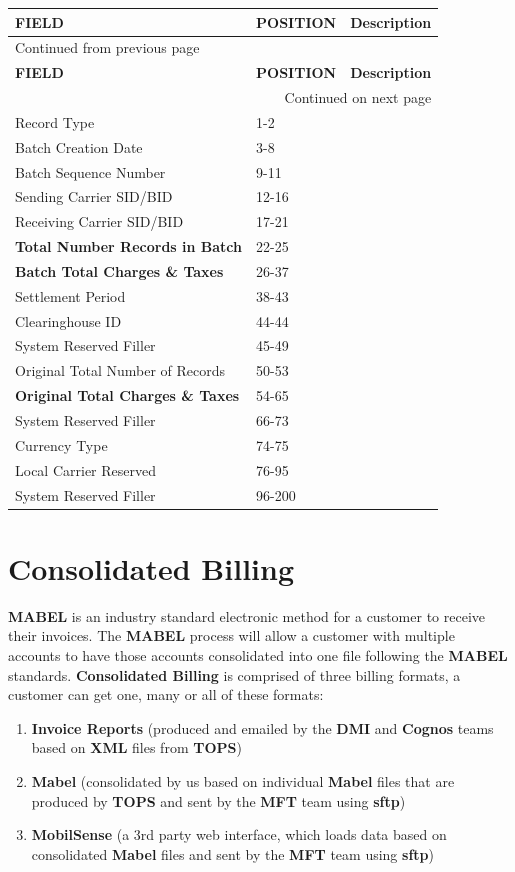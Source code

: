 \documentclass[12pt,twoside]{article}
\begin{document}
\begin{longtable}{l|l|l}
\hline
\textbf{FIELD} & \textbf{POSITION} & \textbf{Description}\\
\hline
\endfirsthead
\multicolumn{3}{l}{Continued from previous page} \\
\hline

\textbf{FIELD} & \textbf{POSITION} & \textbf{Description} \\

\hline
\endhead
\hline\multicolumn{3}{r}{Continued on next page} \\
\endfoot
\endlastfoot
\hline
Record Type & 1-2 & \\
Batch Creation Date & 3-8 & \\
Batch Sequence Number & 9-11 & \\
Sending Carrier SID/BID & 12-16 & \\
Receiving Carrier SID/BID & 17-21 & \\
\textbf{Total Number Records in Batch} & 22-25 & \\
\textbf{Batch Total Charges \& Taxes} & 26-37 & \\
Settlement Period & 38-43 & \\
Clearinghouse ID & 44-44 & \\
System Reserved Filler & 45-49 & \\
Original Total Number of Records & 50-53 & \\
\textbf{Original Total Charges \& Taxes} & 54-65 & \\
System Reserved Filler & 66-73 & \\
Currency Type & 74-75 & \\
Local Carrier Reserved & 76-95 & \\
System Reserved Filler & 96-200 & \\
\hline
\end{longtable}
\normalsize
\newpage
\section{Consolidated Billing}
\label{sec:orgheadline60}
\textbf{MABEL} is an industry standard electronic method for a customer to receive their invoices.  
The \textbf{MABEL} process will allow a customer with multiple accounts to have those accounts consolidated into one file following the \textbf{MABEL} standards. 
\textbf{Consolidated Billing} is comprised of three billing formats, a customer can get one, many or all of these formats:
\begin{enumerate}
\item \textbf{Invoice Reports} (produced and emailed by the \textbf{DMI} and \textbf{Cognos} teams based on \textbf{XML} files from \textbf{TOPS})
\item \textbf{Mabel}  (consolidated by us based on individual \textbf{Mabel} files that are produced by \textbf{TOPS} and sent by the \textbf{MFT} team using \textbf{sftp})
\item \textbf{MobilSense} (a 3rd party web interface, which loads data based on consolidated \textbf{Mabel} files and sent by the \textbf{MFT} team using \textbf{sftp})
\end{enumerate}
\end{document}
